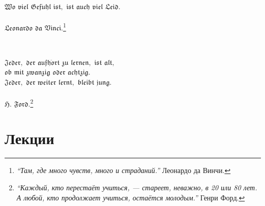 \documentclass[12pt,a5paper, twoside,reqno, openany]{book}
\numberwithin{equation}{section}
\theoremstyle{definition}
\begin{document}
~\\

\begin{flushright}
{\Large{$\mathfrak{Wo}$ $\mathfrak{viel}$ $\mathfrak{Gef\ddot{u}hl}$ $\mathfrak{ist,}$ $\mathfrak{ist}$ $\mathfrak{auch}$ $\mathfrak{viel}$ $\mathfrak{Leid.}$}} \\
~\\
{$\mathfrak{Leonardo}$ $\mathfrak{da}$ $\mathfrak{ Vinci.}$\footnote{{\textit{``Там, где много чувств, много и страданий.''}} \small{Леонардо да Винчи.}}}
\end{flushright}


~\\

\begin{flushright}
{\Large{$\mathfrak{Jeder,}$ $\mathfrak{der}$ $\mathfrak{aufh\ddot{o}rt}$ $\mathfrak{zu}$ $\mathfrak{lernen,}$ $\mathfrak{ist}$ $\mathfrak{alt,}$ \\ $\mathfrak{ob}$ $\mathfrak{mit}$ $\mathfrak{zwanzig}$ $\mathfrak{oder}$ $\mathfrak{achtzig.}$\\
$\mathfrak{Jeder,}$ $\mathfrak{der}$ $\mathfrak{weiter}$ $\mathfrak{lernt,}$ $\mathfrak{bleibt}$ $\mathfrak{jung.}$}} \\
~\\
{$\mathfrak{H.}$ $\mathfrak{Ford.}$}\footnote{{\textit{``Каждый, кто перестаёт учиться, — стареет, неважно, в 20 или 80 лет. А любой, кто продолжает \phantom{``Каждый, кто перестает учиться, — стареет, неважно aaaaa}  учиться, остаётся молодым.''}} \small{Генри Форд.}}
\end{flushright}


\thispagestyle{empty}

\newpage

\tableofcontents
\clearpage


\part{Лекции}
%

%

%

%

%

%

%

%
\end{document}
